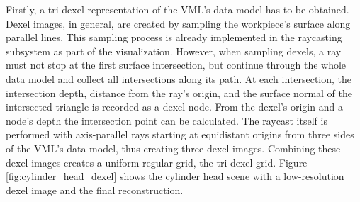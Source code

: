 Firstly, a tri-dexel representation of the VML's data model has to be obtained.
Dexel images, in general, are created by sampling the workpiece's surface along parallel lines.
This sampling process is already implemented in the raycasting subsystem as part of the visualization.
However, when sampling dexels, a ray must not stop at the first surface intersection, but continue through the whole data model and collect all intersections along its path.
At each intersection, the intersection depth, \ie distance from the ray's origin, and the surface normal of the intersected triangle is recorded as a dexel node.
From the dexel's origin and a node's depth the intersection point can be calculated.
The raycast itself is performed with axis-parallel rays starting at equidistant origins from three sides of the VML's data model, thus creating three dexel images.
Combining these dexel images creates a uniform regular grid, the tri-dexel grid.
Figure \ref{fig:cylinder_head_dexel} shows the cylinder head scene with a low-resolution dexel image and the final reconstruction.

